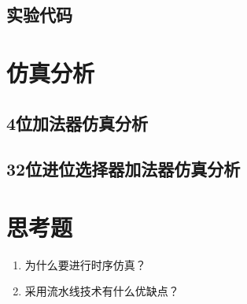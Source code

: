 \documentclass{../source/Experiment}
\begin{document}
            \subsection{实验代码}

            

            

            
        \section{仿真分析}
            \subsection{4位加法器仿真分析}

            \subsection{32位进位选择器加法器仿真分析}
        
        \section{思考题}
            \begin{enumerate}
                \item 为什么要进行时序仿真？
                \item 采用流水线技术有什么优缺点？
            \end{enumerate}
\end{document}
